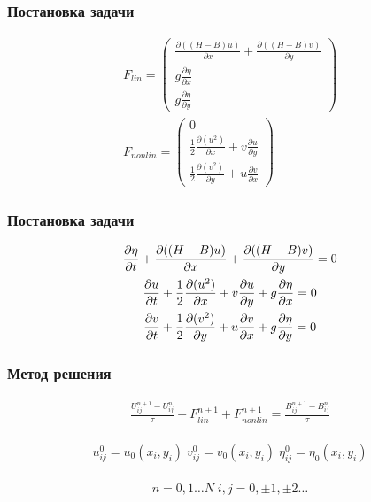 \documentclass[14pt]{beamer}
\begin{document}
\begin{frame}
\frametitle{Постановка задачи}
\begin{gather}
\label{eq:FLin}
F_{lin}=\begin{pmatrix}
\frac{\partial ((H-B)u)}{\partial x}+\frac{\partial ((H-B)v)}{\partial y}\\
g\frac{\partial \eta}{\partial x}\\
g\frac{\partial \eta}{\partial y}
\end{pmatrix}\\
\label{eq:FNonLin}
F_{nonlin}=\begin{pmatrix}
0\\
\frac{1}{2}\frac{\partial (u^2)}{\partial x} + v\frac{\partial u}{\partial y}\\
\frac{1}{2}\frac{\partial (v^2)}{\partial y} + u\frac{\partial v}{\partial x}
\end{pmatrix}
\end{gather}
\end{frame}

\begin{frame}
\frametitle{Постановка задачи}
\begin{gather}
\frac{\partial \eta}{\partial t}+\frac{\partial ((H-B)u)}{\partial x}+\frac{\partial ((H-B)v)}{\partial y}=0\notag\\
\frac{\partial u}{\partial t}+\frac{1}{2}\frac{\partial (u^2)}{\partial x} + v\frac{\partial u}{\partial y}+g\frac{\partial \eta}{\partial x}=0\\
\frac{\partial v}{\partial t}+\frac{1}{2}\frac{\partial (v^2)}{\partial y} + u\frac{\partial v}{\partial x}+g\frac{\partial \eta}{\partial y}=0\notag
\end{gather}
\end{frame}

\begin{frame}
\frametitle{Метод решения}

\begin{eqnarray}
\label{eq:ApproxMainEq}
\frac{U_{ij}^{n+1}-U_{ij}^{n}}{\tau}+F^{n+1}_{lin}+F^{n+1}_{nonlin}=\frac{B_{ij}^{n+1}-B_{ij}^{n}}{\tau}
\end{eqnarray}

\begin{gather}
\begin{split}
\label{eq:BeginValues}
u_{ij}^0=u_0(x_i,y_i)\;
v_{ij}^0=v_0(x_i,y_i)\;
\eta_{ij}^0=\eta_0(x_i,y_i)
\end{split}
\end{gather}

\begin{gather*}
n=0,1 \ldots N \; i,j=0,\pm 1,\pm 2 \ldots
\end{gather*}
\end{frame}
\end{document}
